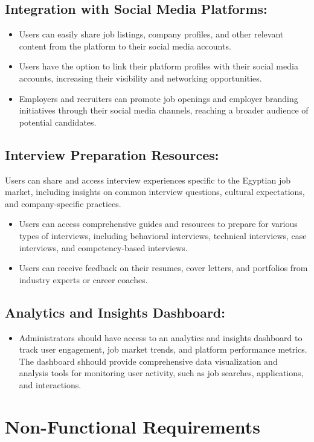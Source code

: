\documentclass[titlepage]{article}
\begin{document}
\subsection{Integration with Social Media Platforms:}
\begin{itemize}
    \item Users can easily share job listings, company profiles, and other relevant content from the platform to their social media accounts.
    \item Users have the option to link their platform profiles with their social media accounts, increasing their visibility and networking opportunities.
    \item Employers and recruiters can promote job openings and employer branding initiatives through their social media channels, reaching a broader audience of potential candidates.
\end{itemize}
\subsection{Interview Preparation Resources:}
Users can share and access interview experiences specific to the Egyptian job market, including insights on common interview questions, cultural expectations, and company-specific practices.
\begin{itemize}
    \item Users can access comprehensive guides and resources to prepare for various types of interviews, including behavioral interviews, technical interviews, case interviews, and competency-based interviews.
    \item Users can receive feedback on their resumes, cover letters, and portfolios from industry experts or career coaches.
\end{itemize}

\subsection{Analytics and Insights Dashboard:}
\begin{itemize}
    \item Administrators should have access to an analytics and insights dashboard to track user engagement, job market trends, and platform performance metrics. The dashboard shhould provide comprehensive data visualization and analysis tools for monitoring user activity, such as job searches, applications, and interactions.
\end{itemize}
\section{Non-Functional Requirements}
\end{document}

